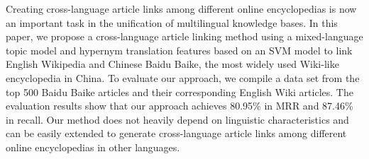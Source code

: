 Creating cross-language article links among different online encyclopedias is now an important task in the unification of multilingual knowledge bases. In this paper, we propose a cross-language article linking method using a mixed-language topic model and hypernym translation features based on an SVM model to link English Wikipedia and Chinese Baidu Baike, the most widely used Wiki-like encyclopedia in China. To evaluate our approach, we compile a data set from the top 500 Baidu Baike articles and their corresponding English Wiki articles. The evaluation results show that our approach achieves 80.95\% in MRR and 87.46\% in recall. Our method does not heavily depend on linguistic characteristics and can be easily extended to generate cross-language article links among different online encyclopedias in other languages.
